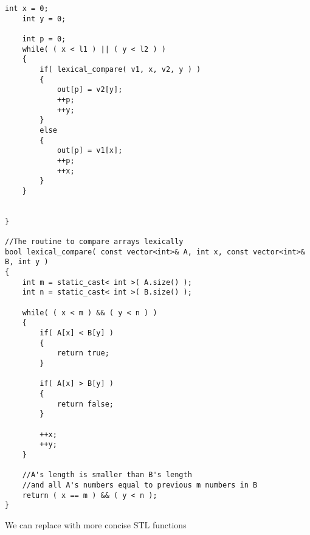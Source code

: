 \begin{lstlisting}[style=customc, caption={Greedy Approach}]
    int x = 0;
    int y = 0;

    int p = 0;
    while( ( x < l1 ) || ( y < l2 ) )
    {
        if( lexical_compare( v1, x, v2, y ) )
        {
            out[p] = v2[y];
            ++p;
            ++y;
        }
        else
        {
            out[p] = v1[x];
            ++p;
            ++x;
        }
    }


}

//The routine to compare arrays lexically
bool lexical_compare( const vector<int>& A, int x, const vector<int>& B, int y )
{
    int m = static_cast< int >( A.size() );
    int n = static_cast< int >( B.size() );

    while( ( x < m ) && ( y < n ) )
    {
        if( A[x] < B[y] )
        {
            return true;
        }

        if( A[x] > B[y] )
        {
            return false;
        }

        ++x;
        ++y;
    }

    //A's length is smaller than B's length
    //and all A's numbers equal to previous m numbers in B
    return ( x == m ) && ( y < n );
}

\end{lstlisting}

We can replace with more concise STL functions


